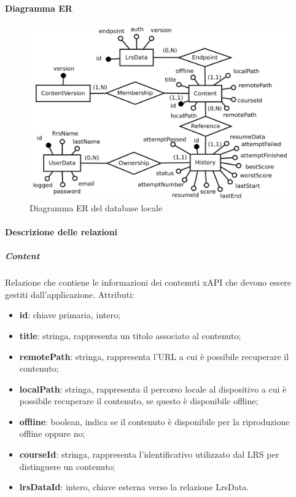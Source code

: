 \documentclass[../Tesi.tex]{subfiles}
\begin{document}
			\paragraph{Diagramma ER}	
			\hfill \break
				\begin{figure} [H]
					\centering
					\includegraphics[scale=0.4]{images/er/RealmDB}
						\caption{Diagramma ER del database locale}
				\end{figure}

			\paragraph{Descrizione delle relazioni}
			\subparagraph*{Content}
			Relazione che contiene le informazioni dei contenuti xAPI che devono essere gestiti dall'applicazione. Attributi:
			\begin{itemize}
				\item \textbf{id}: chiave primaria, intero;
				\item \textbf{title}: stringa, rappresenta un titolo associato al contenuto;
				\item \textbf{remotePath}: stringa, rappresenta l'URL a cui è possibile recuperare il contenuto;
				\item \textbf{localPath}: stringa, rappresenta il percorso locale al dispositivo a cui è possibile recuperare il contenuto, se questo è disponibile offline;
				\item \textbf{offline}: boolean, indica se il contenuto è disponibile per la riproduzione offline oppure no;
				\item \textbf{courseId}: stringa, rappresenta l'identificativo utilizzato dal LRS per distinguere un contenuto;
				\item \textbf{lrsDataId}: intero, chiave esterna verso la relazione LrsData.
			\end{itemize}
\end{document}
